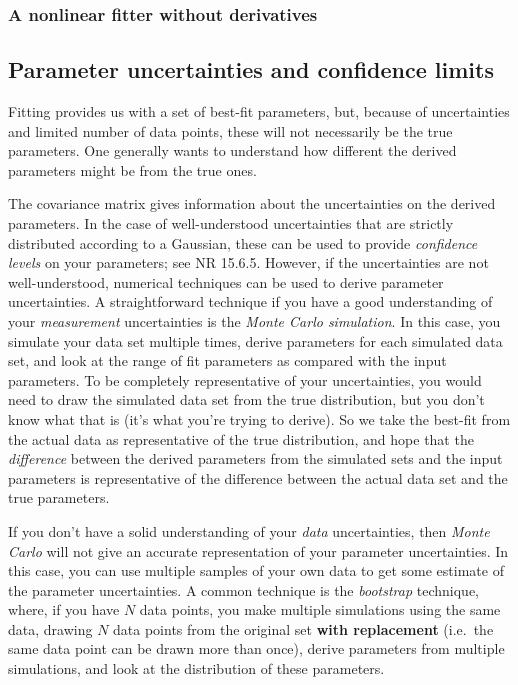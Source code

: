 \documentclass[12pt]{article}
\begin{document}
\subsubsection{A nonlinear fitter without derivatives}
\subsection{Parameter uncertainties and confidence limits}
Fitting provides us with a set of best-fit parameters, but, because
of uncertainties and limited number of data points, these will not
necessarily be the true parameters. One generally wants to understand
how different the derived parameters might be from the true ones.

The covariance matrix gives information about the uncertainties on
the derived parameters. In the case of well-understood uncertainties
that are strictly distributed according to a Gaussian, these can be
used to provide \emph{confidence levels} on your parameters;
see NR 15.6.5. However, if the uncertainties are not well-understood,
numerical techniques can be used to derive parameter uncertainties.
A straightforward technique if you have a good understanding of your
\emph{measurement} uncertainties is the \emph{Monte Carlo
simulation}. In this case, you simulate your data set multiple
times, derive parameters for each simulated data set, and look at
the range of fit parameters as compared with the input parameters.
To be completely representative of your uncertainties, you would
need to draw the simulated data set from the true distribution,
but you don't know what that is (it's what you're trying to derive).
So we take the best-fit from the actual data as representative of the
true distribution,
and hope that the \emph{difference} between the derived parameters
from the simulated sets and the input parameters is representative
of the difference between the actual data set and the true parameters.

If you don't have a solid understanding of your \emph{data}
uncertainties, then \emph{Monte Carlo} will not give an accurate
representation of your parameter uncertainties. In this case,
you can use multiple samples of your own data to get some estimate
of the parameter uncertainties. A common technique is the
\emph{bootstrap} technique, where, if you have $N$ data points,
you make multiple simulations using the same data, drawing $N$
data points from the original set \- \textbf{with replacement}
(i.e.\ the same data point can be drawn more than once), derive
parameters from multiple simulations, and look at the distribution
of these parameters.
\end{document}
